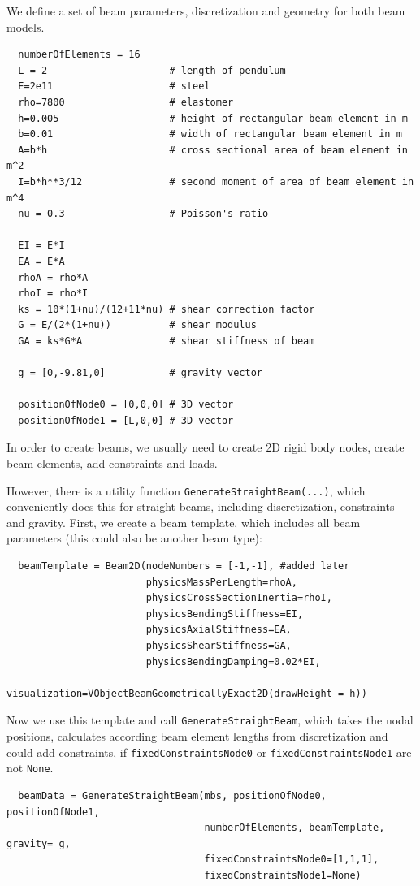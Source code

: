 \noindent We define a set of beam parameters, discretization and geometry for both beam models.
\pythonstyle\begin{lstlisting}
  numberOfElements = 16
  L = 2                     # length of pendulum 
  E=2e11                    # steel
  rho=7800                  # elastomer
  h=0.005                   # height of rectangular beam element in m
  b=0.01                    # width of rectangular beam element in m
  A=b*h                     # cross sectional area of beam element in m^2
  I=b*h**3/12               # second moment of area of beam element in m^4
  nu = 0.3                  # Poisson's ratio
      
  EI = E*I
  EA = E*A
  rhoA = rho*A
  rhoI = rho*I
  ks = 10*(1+nu)/(12+11*nu) # shear correction factor
  G = E/(2*(1+nu))          # shear modulus
  GA = ks*G*A               # shear stiffness of beam

  g = [0,-9.81,0]           # gravity vector

  positionOfNode0 = [0,0,0] # 3D vector
  positionOfNode1 = [L,0,0] # 3D vector
\end{lstlisting}

\noindent In order to create beams, we usually need to create 2D rigid body nodes, 
create beam elements, add constraints and loads.

\noindent However, there is a utility function \texttt{GenerateStraightBeam(...)}, 
which conveniently does this for straight beams, including discretization, constraints and gravity.
First, we create a beam template, which includes all beam parameters (this could also be another beam type):
\pythonstyle\begin{lstlisting}
  beamTemplate = Beam2D(nodeNumbers = [-1,-1], #added later
                        physicsMassPerLength=rhoA,
                        physicsCrossSectionInertia=rhoI,
                        physicsBendingStiffness=EI,
                        physicsAxialStiffness=EA,
                        physicsShearStiffness=GA,
                        physicsBendingDamping=0.02*EI,
                        visualization=VObjectBeamGeometricallyExact2D(drawHeight = h))
\end{lstlisting}

\noindent Now we use this template and call \texttt{GenerateStraightBeam}, which takes the nodal positions,
calculates according beam element lengths from discretization and could add constraints,
if \texttt{fixedConstraintsNode0} or \texttt{fixedConstraintsNode1} are not \texttt{None}.
\pythonstyle\begin{lstlisting}
  beamData = GenerateStraightBeam(mbs, positionOfNode0, positionOfNode1, 
                                  numberOfElements, beamTemplate, gravity= g, 
                                  fixedConstraintsNode0=[1,1,1], 
                                  fixedConstraintsNode1=None)
\end{lstlisting}

